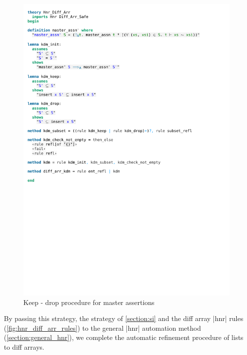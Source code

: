 \begin{figure}[htpb]
    \includegraphics[trim={0 12,4cm 0 16cm}, clip, width=1.00\textwidth]{figures/Theory_Hnr_Diff_Arr_KDM.pdf}
    \caption[Keep - drop procedure for master assertions]{Keep - drop procedure for master assertions}
    \label{fig:kdm_method}
\end{figure}

\noindent By passing this strategy, the strategy of \autoref{section:si} and the diff array |hnr| rules (\autoref{fig:hnr_diff_arr_rules}) to the general |hnr| automation method (\autoref{section:general_hnr}), we complete the automatic refinement procedure of lists to diff arrays.

